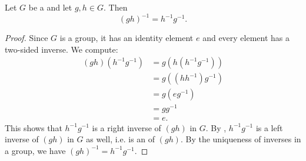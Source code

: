 \begin{lemma} \label{lemma:inverse_of_product_of_two_elements_in_a_group}
    Let $G$ be a  and let $g,h \in G$. Then
    $$(gh)^{-1} = h^{-1} g^{-1}.$$
\end{lemma}
\begin{proof}
    Since $G$ is a group, it has an identity element $e$ and every element has a two-sided inverse. We compute:
    \begin{align*}
        (gh)(h^{-1}g^{-1}) 
        &= g(h(h^{-1}g^{-1})) \\
        &= g((hh^{-1})g^{-1}) \\
        &= g (e g^{-1} ) \\ 
        &= g g^{-1}  \\
        &= e.
    \end{align*}
    This shows that $h^{-1}g^{-1}$ is a right inverse of $(gh)$ in $G$. By , $h^{-1}g^{-1}$ is a left inverse of $(gh)$ in $G$ as well, i.e. is an  of $(gh)$. By the uniqueness of inverses in a group, we have $(gh)^{-1} = h^{-1}g^{-1}$.
\end{proof}